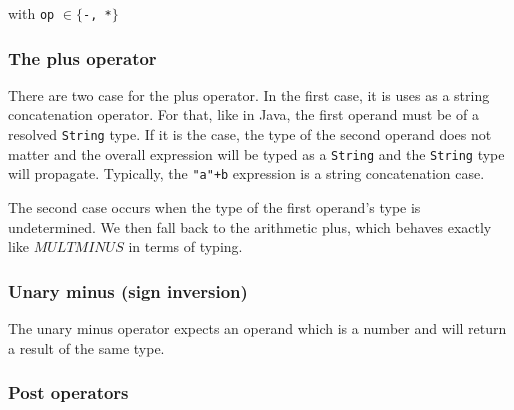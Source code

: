 \documentclass[11pt]{article}
\begin{document}
\begin{center}
 
\DP
\end{center}
\begin{center}with  \texttt{op} $\in \{$\texttt{-, *}$\}$\end{center}


\subsubsection{The plus operator}

There are two case for the plus operator. In the first case, it is uses as a string concatenation operator. For that, like in Java, the first operand must be of a resolved \texttt{String} type. If it is the case, the type of the second operand does not matter and the overall expression will be typed as a \texttt{String} and the \texttt{String} type will propagate. Typically, the \texttt{"a"+b} expression is a string concatenation case.

\begin{center}
 
\DP
\end{center}

The second case occurs when the type of the first operand's type is undetermined. We then fall back to the arithmetic plus, which behaves exactly like $MULTMINUS$ in terms of typing.

\begin{center}
 
\DP
\end{center}

\subsubsection{Unary minus (sign inversion)}

The unary minus operator expects an operand which is a number and will return a result of the same type.

\begin{center}
\DP
\end{center}

\subsubsection{Post operators}
\end{document}
